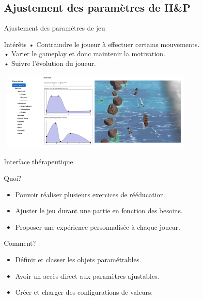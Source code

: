 \documentclass{beamer}
\begin{document}
		\subsection{Ajustement des paramètres de H\&P}	
		\begin{frame}{Ajustement des paramètres de jeu}
				\begin{block}{Intérêts}
					• Contraindre le joueur à effectuer certains mouvements.\\
					• Varier le gameplay et donc maintenir la motivation.\\
					• Suivre l'évolution du joueur.
				\end{block}
			\includegraphics[width=10cm, height=4cm]{../images/comparatif_interface_rochers.png}
		\end{frame}			
			
		\begin{frame}{Interface thérapeutique}
			\begin{block}{Quoi?}
				\begin{itemize}
					\item Pouvoir réaliser plusieurs exercices de rééducation.
					\item Ajuster le jeu durant une partie en fonction des besoins.
					\item Proposer une expérience personnalisée à chaque joueur.
				\end{itemize}
			\end{block}
			\begin{exampleblock}{Comment?}
				\begin{itemize}
					\item Définir et classer les objets paramétrables.
					\item Avoir un accès direct aux paramètres ajustables.			
					\item Créer et charger des configurations de valeurs.
				\end{itemize}
			\end{exampleblock}
		\end{frame}			
		
\end{document}
